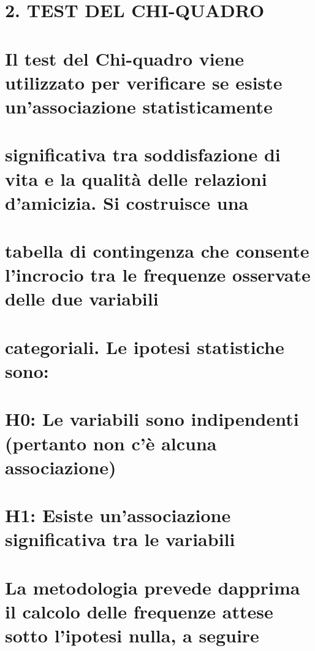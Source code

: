 \documentclass[
]{article}
\begin{document}
\section{2. TEST DEL CHI-QUADRO}\label{test-del-chi-quadro}

\section{Il test del Chi-quadro viene utilizzato per verificare se
esiste un'associazione
statisticamente}\label{il-test-del-chi-quadro-viene-utilizzato-per-verificare-se-esiste-unassociazione-statisticamente}

\section{significativa tra soddisfazione di vita e la qualità delle
relazioni d'amicizia. Si costruisce
una}\label{significativa-tra-soddisfazione-di-vita-e-la-qualituxe0-delle-relazioni-damicizia.-si-costruisce-una}

\section{tabella di contingenza che consente l'incrocio tra le frequenze
osservate delle due
variabili}\label{tabella-di-contingenza-che-consente-lincrocio-tra-le-frequenze-osservate-delle-due-variabili}

\section{categoriali. Le ipotesi statistiche
sono:}\label{categoriali.-le-ipotesi-statistiche-sono}

\section{H0: Le variabili sono indipendenti (pertanto non c'è alcuna
associazione)}\label{h0-le-variabili-sono-indipendenti-pertanto-non-cuxe8-alcuna-associazione}

\section{H1: Esiste un'associazione significativa tra le
variabili}\label{h1-esiste-unassociazione-significativa-tra-le-variabili}

\section{La metodologia prevede dapprima il calcolo delle frequenze
attese sotto l'ipotesi nulla, a
seguire}\label{la-metodologia-prevede-dapprima-il-calcolo-delle-frequenze-attese-sotto-lipotesi-nulla-a-seguire}
\end{document}

